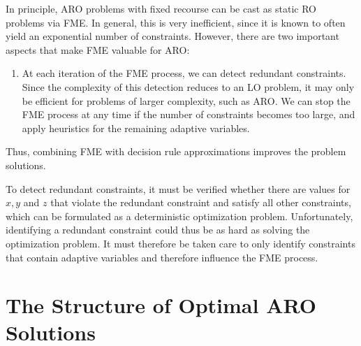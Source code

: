 In principle, ARO problems with fixed recourse can be cast as static RO problems via FME. In general, this is very inefficient, since it is known to often yield an exponential number of constraints. However, there are two important aspects that make FME valuable for ARO:
\begin{enumerate}
	\item At each iteration of the FME process, we can detect redundant constraints. Since the complexity of this detection reduces to an LO problem, it may only be efficient for problems of larger complexity, such as ARO.
	\tiem We can stop the FME process at any time if the number of constraints becomes too large, and apply heuristics for the remaining adaptive variables.
\end{enumerate}
Thus, combining FME with decision rule approximations improves the problem solutions.

To detect redundant constraints, it must be verified whether there are values for $x,y$ and $z$  that violate the redundant constraint and satisfy all other constraints, which can be formulated as a deterministic optimization problem. Unfortunately, identifying a redundant constraint could thus be as hard as solving the optimization problem. It must therefore be taken care to only identify constraints that contain adaptive variables and therefore influence the FME process.

\section{The Structure of Optimal ARO Solutions}

